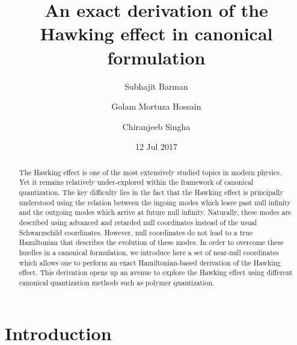 \documentclass[aps,12pt,showpacs]{revtex4-2}
\begin{document}
\title{An exact derivation of the Hawking effect in canonical formulation}




\author{Subhajit Barman}


\author{Golam Mortuza Hossain}

\author{Chiranjeeb Singha}

 

\date{12 Jul 2017 }

\begin{abstract}

The Hawking effect is one of the most extensively studied topics in modern 
physics. Yet it remains relatively under-explored within the framework of 
canonical quantization. The key difficulty lies in the fact that the Hawking 
effect is principally understood using the relation between the ingoing modes 
which leave past null infinity and the outgoing modes which arrive at future 
null infinity. Naturally, these modes are described using advanced and retarded 
null coordinates instead of the usual Schwarzschild coordinates. However, null 
coordinates do not lead to a true Hamiltonian that describes the evolution of 
these modes. In order to overcome these hurdles in a canonical formulation, we 
introduce here a set of near-null coordinates which allows one to perform an 
exact Hamiltonian-based derivation of the Hawking effect. This derivation opens 
up an avenue to explore the Hawking effect using different canonical 
quantization methods such as polymer quantization. 


\end{abstract}

\maketitle



\newpage

\section{Introduction}
%
\end{document}
